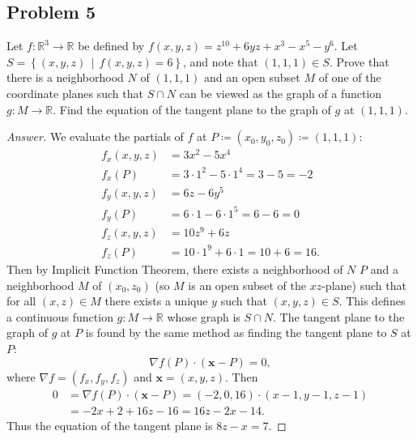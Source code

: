 \documentclass[12pt]{article}
\newcommand{\real}{\mathbb{R}}
\newcommand\paren[1]{\left( #1 \right)}
\newcommand\setb[1]{\left \{ #1 \right \}}
\theoremstyle{definition}
\begin{document}
\subsection{Problem 5}
Let $f : \real^3 \to \real$ be defined by $f(x,y,z) = z^{10} + 6yz + x^3 - x^5 - y^6$. Let $S = \setb{ (x,y,z) \, \middle| \, f(x,y,z) = 6}$, and note that $(1,1,1) \in S$. Prove that there is a neighborhood $N$ of $(1,1,1)$ and an open subset $M$ of one of the coordinate planes such that $S \cap N$ can be viewed as the graph of a function $g : M \to \real$. Find the equation of the tangent plane to the graph of $g$ at $(1,1,1)$.
\begin{proof}[Answer]
    We evaluate the partials of $f$ at $P \coloneqq \paren{x_0,y_0,z_0} \coloneqq (1,1,1)$:
    \begin{align*}
        f_x(x,y,z) & = 3x^2 - 5x^4 \\
        f_x(P) & = 3 \cdot 1^2 - 5 \cdot 1^4 = 3 - 5 = -2 \\
        f_y(x,y,z) & = 6z - 6y^5 \\
        f_y(P) & = 6\cdot1 - 6\cdot1^5 = 6 - 6 = 0 \\
        f_z(x,y,z) & = 10z^9 + 6z \\
        f_z(P) & = 10\cdot1^9 + 6\cdot1 = 10 + 6 = 16.
    \end{align*}
    Then by Implicit Function Theorem, there exists a neighborhood of $N$ $P$ and a neighborhood $M$ of $\paren{x_0,z_0}$ (so $M$ is an open subset of the $xz$-plane) such that for all $(x,z) \in M$  there exists a unique $y$ such that $(x,y,z) \in S$. This defines a continuous function $g : M \to \real$ whose graph is $S \cap N$. The tangent plane to the graph of $g$ at $P$ is found by the same method as finding the tangent plane to $S$ at $P$:
    \[
        \nabla f (P) \cdot \paren{ \mathbf{x} - P } = 0,
    \]
    where $\nabla f = (f_x,f_y,f_z)$ and $\mathbf{x} = (x,y,z)$. Then 
    \begin{align*}
        0 & = \nabla f (P) \cdot \paren{ \mathbf{x} - P } = (-2,0,16) \cdot (x - 1 , y - 1 , z - 1) \\
        & = -2x + 2 + 16z - 16 = 16z - 2x - 14.
    \end{align*}
    Thus the equation of the tangent plane is $\boxed{ 8z - x = 7 . }$
\end{proof}
\end{document}
